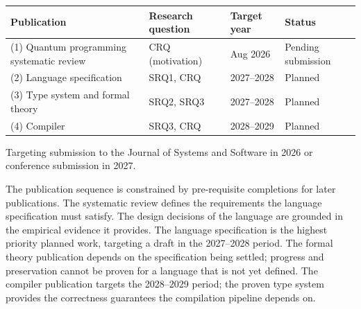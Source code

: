 \vspace{2em}
\begin{threeparttable}
    \begin{tabularx}{\textwidth}{@{}XXlX@{}}
        \toprule
        \textbf{Publication}                        & \textbf{Research question} & \textbf{Target year} & \textbf{Status}    \\
        \midrule
        (1) Quantum programming systematic review & CRQ (motivation)\tnote{*}           & Aug 2026             & Pending submission \\ \addlinespace
        (2) Language specification                & SRQ1, CRQ                  & 2027--2028           & Planned            \\ \addlinespace
        (3) Type system and formal theory         & SRQ2, SRQ3                 & 2027--2028           & Planned            \\ \addlinespace
        (4) Compiler                              & SRQ3, CRQ                  & 2028--2029           & Planned            \\
        \bottomrule
    \end{tabularx}
    \begin{tablenotes}
        \footnotesize
        \item[*] Targeting submission to the Journal of Systems and Software in 2026 or conference submission in 2027.
    \end{tablenotes}
\end{threeparttable}
\vspace{2em}

The publication sequence is constrained by pre-requisite completions for later publications.
The systematic review defines the requirements the language specification must satisfy.
The design decisions of the language are grounded in the empirical evidence it provides.
The language specification is the highest priority planned work, targeting a draft in the 2027--2028 period.
The formal theory publication depends on the specification being settled; progress and preservation cannot be proven for a language that is not yet defined.
The compiler publication targets the 2028--2029 period; the proven type system provides the correctness guarantees the compilation pipeline depends on.

